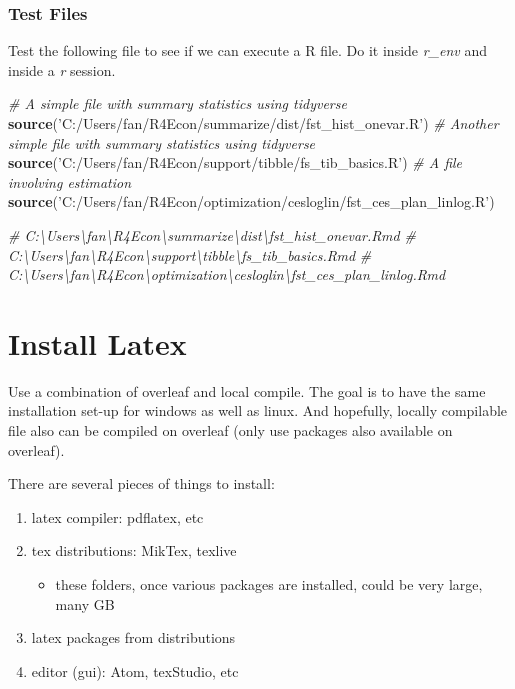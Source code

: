 \documentclass[
]{article}
\newenvironment{Shaded}{\begin{snugshade}}{\end{snugshade}}
\newcommand{\CommentTok}[1]{\textcolor[rgb]{0.56,0.35,0.01}{\textit{#1}}}
\newcommand{\KeywordTok}[1]{\textcolor[rgb]{0.13,0.29,0.53}{\textbf{#1}}}
\newcommand{\NormalTok}[1]{#1}
\newcommand{\StringTok}[1]{\textcolor[rgb]{0.31,0.60,0.02}{#1}}
\providecommand{\tightlist}{%
  \setlength{\itemsep}{0pt}\setlength{\parskip}{0pt}}
\begin{document}
\hypertarget{test-files}{%
\subsubsection{Test Files}\label{test-files}}

Test the following file to see if we can execute a R file. Do it inside
\emph{r\_env} and inside a \emph{r} session.

\begin{Shaded}
\begin{Highlighting}[]
\CommentTok{# A simple file with summary statistics using tidyverse}
\KeywordTok{source}\NormalTok{(}\StringTok{'C:/Users/fan/R4Econ/summarize/dist/fst_hist_onevar.R'}\NormalTok{)}
\CommentTok{# Another simple file with summary statistics using tidyverse}
\KeywordTok{source}\NormalTok{(}\StringTok{'C:/Users/fan/R4Econ/support/tibble/fs_tib_basics.R'}\NormalTok{)}
\CommentTok{# A file involving estimation}
\KeywordTok{source}\NormalTok{(}\StringTok{'C:/Users/fan/R4Econ/optimization/cesloglin/fst_ces_plan_linlog.R'}\NormalTok{)}

\CommentTok{# C:\textbackslash{}Users\textbackslash{}fan\textbackslash{}R4Econ\textbackslash{}summarize\textbackslash{}dist\textbackslash{}fst_hist_onevar.Rmd}
\CommentTok{# C:\textbackslash{}Users\textbackslash{}fan\textbackslash{}R4Econ\textbackslash{}support\textbackslash{}tibble\textbackslash{}fs_tib_basics.Rmd}
\CommentTok{# C:\textbackslash{}Users\textbackslash{}fan\textbackslash{}R4Econ\textbackslash{}optimization\textbackslash{}cesloglin\textbackslash{}fst_ces_plan_linlog.Rmd}
\end{Highlighting}
\end{Shaded}

\hypertarget{install-latex}{%
\section{Install Latex}\label{install-latex}}

Use a combination of overleaf and local compile. The goal is to have the
same installation set-up for windows as well as linux. And hopefully,
locally compilable file also can be compiled on overleaf (only use
packages also available on overleaf).

There are several pieces of things to install:

\begin{enumerate}
\def\labelenumi{\arabic{enumi}.}
\tightlist
\item
  latex compiler: pdflatex, etc
\item
  tex distributions: MikTex, texlive

  \begin{itemize}
  \tightlist
  \item
    these folders, once various packages are installed, could be very
    large, many GB
  \end{itemize}
\item
  latex packages from distributions
\item
  editor (gui): Atom, texStudio, etc
\end{enumerate}
\end{document}
